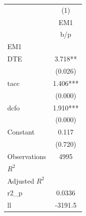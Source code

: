 {
\def\sym#1{\ifmmode^{#1}\else\(^{#1}\)\fi}
\begin{tabular}{l*{1}{c}}
\hline\hline
                    &\multicolumn{1}{c}{(1)}\\
                    &\multicolumn{1}{c}{EM1}\\
                    &         b/p   \\
\hline
EM1                 &               \\
DTE                 &       3.718** \\
                    &     (0.026)   \\
tacc                &       1.406***\\
                    &     (0.000)   \\
dcfo                &       1.910***\\
                    &     (0.000)   \\
Constant            &       0.117   \\
                    &     (0.720)   \\
\hline
Observations        &        4995   \\
\(R^{2}\)           &               \\
Adjusted \(R^{2}\)  &               \\
r2\_p                &      0.0336   \\
ll                  &     -3191.5   \\
\hline\hline
\end{tabular}
}
